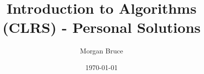 \documentclass[a4paper,12pt]{book}
\begin{document}
\author{Morgan Bruce}
\title{Introduction to Algorithms (CLRS) - Personal Solutions}
\date{\today}

\frontmatter
\maketitle
\tableofcontents

\mainmatter


\backmatter
\end{document}
